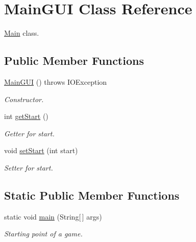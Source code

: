 \hypertarget{classMainGUI}{}\section{Main\+G\+UI Class Reference}
\label{classMainGUI}


\hyperlink{classMain}{Main} class.  


\subsection*{Public Member Functions}
\begin{DoxyCompactItemize}
\item 
\hyperlink{classMainGUI_a49c09db8105ae715258f1a29ac318c66}{Main\+G\+UI} ()  throws I\+O\+Exception 
\begin{DoxyCompactList}\small\item\em Constructor. \end{DoxyCompactList}\item 
int \hyperlink{classMainGUI_a3d35950de747333a96fa0cca3c38eff5}{get\+Start} ()
\begin{DoxyCompactList}\small\item\em Getter for start. \end{DoxyCompactList}\item 
void \hyperlink{classMainGUI_abefcabebf411d9ae06fd1bd0c979ab59}{set\+Start} (int start)
\begin{DoxyCompactList}\small\item\em Setter for start. \end{DoxyCompactList}\end{DoxyCompactItemize}
\subsection*{Static Public Member Functions}
\begin{DoxyCompactItemize}
\item 
static void \hyperlink{classMainGUI_a8dd5b61b10beb51baab3664b296c4381}{main} (String\mbox{[}$\,$\mbox{]} args)\hypertarget{classMainGUI_a8dd5b61b10beb51baab3664b296c4381}{}\label{classMainGUI_a8dd5b61b10beb51baab3664b296c4381}

\begin{DoxyCompactList}\small\item\em Starting point of a game. \end{DoxyCompactList}\end{DoxyCompactItemize}
